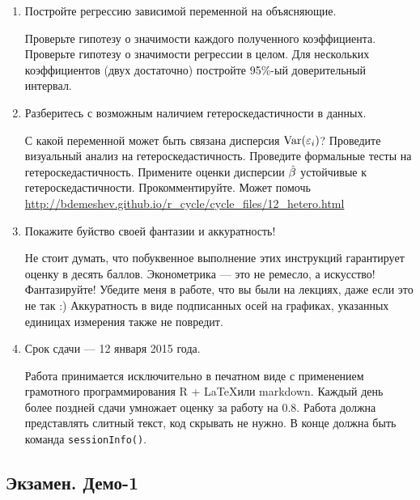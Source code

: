 \documentclass[12pt, a4paper]{article}
\begin{document}
\begin{enumerate}
\item Постройте регрессию зависимой переменной на объясняющие.

Проверьте гипотезу о значимости каждого полученного коэффициента. Проверьте гипотезу о значимости регрессии в целом. Для нескольких коэффициентов (двух достаточно) постройте 95\%-ый доверительный интервал.

\item Разберитесь с возможным наличием гетероскедастичности в данных.

С какой переменной может быть связана дисперсия $\operatorname{Var}(\varepsilon_i)$? Проведите визуальный анализ на гетероскедастичность. Проведите формальные тесты на гетероскедастичность. Примените оценки дисперсии $\hat{\beta}$ устойчивые к гетероскедастичности. Прокомментируйте. Может помочь \url{http://bdemeshev.github.io/r_cycle/cycle_files/12_hetero.html}

\item Покажите буйство своей фантазии и аккуратность!

Не стоит думать, что побуквенное выполнение этих инструкций гарантирует оценку в десять баллов. Эконометрика — это не ремесло, а искусство! Фантазируйте! Убедите меня в работе, что вы были на лекциях, даже если это не так :) Аккуратность в виде подписанных осей на графиках, указанных единицах измерения также не повредит.

\item Срок сдачи — 12 января 2015 года.

Работа принимается исключительно в печатном виде с применением грамотного программирования R + \LaTeX или markdown. Каждый день более поздней сдачи умножает оценку за работу на $0.8$.  Работа должна представлять слитный текст, код скрывать не нужно. В конце должна быть команда \verb|sessionInfo()|.





\end{enumerate}


\subsection{Экзамен. Демо-1}
\end{document}
